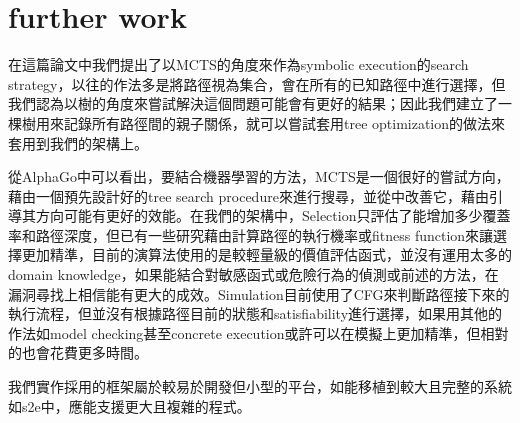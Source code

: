 \documentclass[12pt,a4paper,oneside]{book}
\begin{document}
\section{further work}

在這篇論文中我們提出了以MCTS的角度來作為symbolic execution的search strategy，以往的作法多是將路徑視為集合，會在所有的已知路徑中進行選擇，但我們認為以樹的角度來嘗試解決這個問題可能會有更好的結果；因此我們建立了一棵樹用來記錄所有路徑間的親子關係，就可以嘗試套用tree optimization的做法來套用到我們的架構上。

從AlphaGo中可以看出，要結合機器學習的方法，MCTS是一個很好的嘗試方向，藉由一個預先設計好的tree search procedure來進行搜尋，並從中改善它，藉由引導其方向可能有更好的效能。在我們的架構中，Selection只評估了能增加多少覆蓋率和路徑深度，但已有一些研究藉由計算路徑的執行機率或fitness function來讓選擇更加精準，目前的演算法使用的是較輕量級的價值評估函式，並沒有運用太多的domain knowledge，如果能結合對敏感函式或危險行為的偵測或前述的方法，在漏洞尋找上相信能有更大的成效。Simulation目前使用了CFG來判斷路徑接下來的執行流程，但並沒有根據路徑目前的狀態和satisfiability進行選擇，如果用其他的作法如model checking甚至concrete execution或許可以在模擬上更加精準，但相對的也會花費更多時間。

我們實作採用的框架屬於較易於開發但小型的平台，如能移植到較大且完整的系統如s2e中，應能支援更大且複雜的程式。

\newpage

\printbibliography[title={References}]

\newpage
\end{document}
